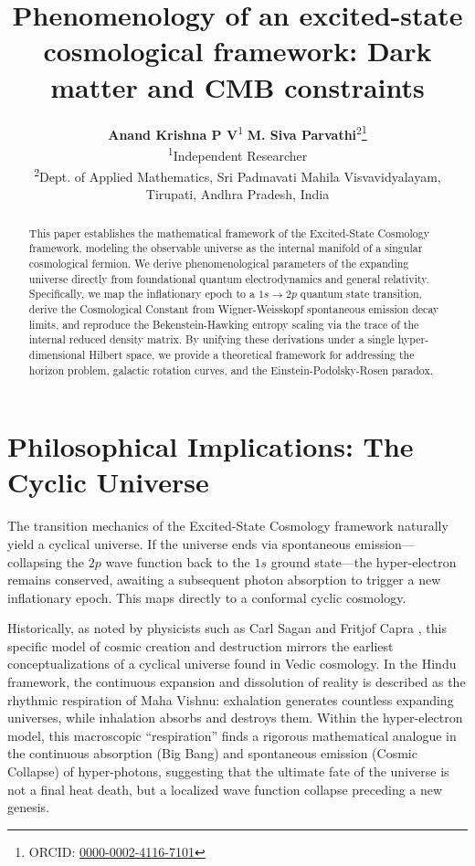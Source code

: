 \documentclass[12pt,a4paper]{article}
\title{Phenomenology of an excited-state cosmological framework: Dark matter and CMB constraints}
\author{
    \normalsize \textbf{Anand Krishna P V}\textsuperscript{1} \quad \textbf{M. Siva Parvathi}\textsuperscript{2}\thanks{ORCID: \href{https://orcid.org/0000-0002-4116-7101}{0000-0002-4116-7101}}\\[0.8em]
    \small\textsuperscript{1}Independent Researcher\\[0.2em]
    \small\textsuperscript{2}Dept. of Applied Mathematics, Sri Padmavati Mahila Visvavidyalayam,\\
    \small Tirupati, Andhra Pradesh, India
}
\date{}
\begin{document}
\maketitle

\begin{abstract}
This paper establishes the mathematical framework of the Excited-State Cosmology framework, modeling the observable universe as the internal manifold of a singular cosmological fermion. We derive phenomenological parameters of the expanding universe directly from foundational quantum electrodynamics and general relativity. Specifically, we map the inflationary epoch to a $1s \rightarrow 2p$ quantum state transition, derive the Cosmological Constant from Wigner-Weisskopf spontaneous emission decay limits, and reproduce the Bekenstein-Hawking entropy scaling via the trace of the internal reduced density matrix. By unifying these derivations under a single hyper-dimensional Hilbert space, we provide a theoretical framework for addressing the horizon problem, galactic rotation curves, and the Einstein-Podolsky-Rosen paradox.
\end{abstract}

\vspace{0.5cm}















\chapter{Philosophical Implications: The Cyclic Universe}
The transition mechanics of the Excited-State Cosmology framework naturally yield a cyclical universe. If the universe ends via spontaneous emission---collapsing the $2p$ wave function back to the $1s$ ground state---the hyper-electron remains conserved, awaiting a subsequent photon absorption to trigger a new inflationary epoch. This maps directly to a conformal cyclic cosmology. 

Historically, as noted by physicists such as Carl Sagan and Fritjof Capra \cite{Sagan1980, Capra1975}, this specific model of cosmic creation and destruction mirrors the earliest conceptualizations of a cyclical universe found in Vedic cosmology. In the Hindu framework, the continuous expansion and dissolution of reality is described as the rhythmic respiration of Maha Vishnu: exhalation generates countless expanding universes, while inhalation absorbs and destroys them. Within the hyper-electron model, this macroscopic ``respiration'' finds a rigorous mathematical analogue in the continuous absorption (Big Bang) and spontaneous emission (Cosmic Collapse) of hyper-photons, suggesting that the ultimate fate of the universe is not a final heat death, but a localized wave function collapse preceding a new genesis.




\end{document}
